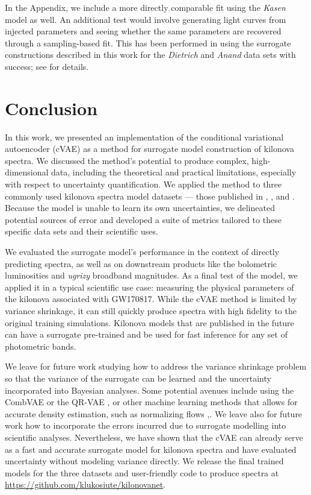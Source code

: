 \documentclass[fleqn,usenatbib,useAMS]{mnras}
\begin{document}
In the Appendix, we include a more directly comparable fit using the \emph{Kasen} model as well. 
An additional test would involve generating light curves from injected parameters and seeing whether the same parameters are recovered through a sampling-based fit.
This has been performed in \cite{lukosiute_2021} using the surrogate constructions described in this work for the \emph{Dietrich} and \emph{Anand} data sets with success; see \cite{lukosiute_2021} for details. 

\section{Conclusion}
\label{sec:conclusion}
In this work, we presented an implementation of the conditional variational autoencoder (cVAE) as a method for surrogate model construction of kilonova spectra. 
We discussed the method's potential to produce complex, high-dimensional data, including the theoretical and practical limitations, especially with respect to uncertainty quantification.
We applied the method to three commonly used kilonova spectra model datasets ---  those published in \cite{kasenOriginHeavyElements2017}, \cite{dietrichMultimessengerConstraintsNeutronstar2020}, and \cite{anandOpticalFollowupNeutron2021}. 
Because the model is unable to learn its own uncertainties, we delineated potential sources of error and developed a suite of metrics tailored to these specific data sets and their scientific uses. 

We evaluated the surrogate model's performance in the context of directly predicting spectra, as well as on downstream products like the bolometric luminosities and {\it ugrizy} broadband magnitudes. 
As a final test of the model, we applied it in a typical scientific use case: measuring the physical parameters of the kilonova associated with GW170817.
While the cVAE method is limited by variance shrinkage, it can still quickly produce spectra with high fidelity to the original training simulations. 
Kilonova models that are published in the future can have a surrogate pre-trained and be used for fast inference for any set of photometric bands.
 
We leave for future work studying how to address the variance shrinkage problem so that the variance of the surrogate can be learned and the uncertainty incorporated into Bayesian analyses.
Some potential avenues include using the CombVAE \citep{detlefsenReliableTrainingEstimation2019} or the QR-VAE \cite{akramiAddressingVarianceShrinkage2020}, or other machine learning methods that allows for accurate density estimation, such as normalizing flows \cite{rezendeVariationalInferenceNormalizing2016, dinhNICENonlinearIndependent2015},.
We leave also for future work how to incorporate the errors incurred due to surrogate modelling into scientific analyses. 
Nevertheless, we have shown that the cVAE can already serve as a fast and accurate surrogate model for kilonova spectra and have evaluated uncertainty without modeling variance directly.
We release the final trained models for the three datasets and user-friendly code to produce spectra at \url{https://github.com/klukosiute/kilonovanet}.
\end{document}
